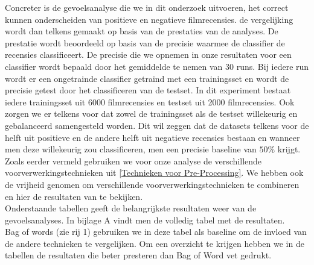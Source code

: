 Concreter is de gevoelsanalyse die we in dit onderzoek uitvoeren, het correct kunnen onderscheiden van positieve en negatieve filmrecensies. de vergelijking wordt dan telkens gemaakt op basis van de prestaties van de analyses. De prestatie wordt beoordeeld op basis van de precisie waarmee de classifier de recensies classificeert. De precisie die we opnemen in onze resultaten voor een classifier wordt bepaald door het gemiddelde te nemen van 30 runs. Bij iedere run wordt er een ongetrainde classifier getraind met een trainingsset en wordt de precisie getest door het classificeren van de testset. In dit experiment bestaat iedere trainingsset uit 6000 filmrecensies en testset uit 2000 filmrecensies. Ook zorgen we er telkens voor dat zowel de trainingsset als de testset willekeurig en gebalanceerd samengesteld worden. Dit wil zeggen dat de datasets telkens voor de helft uit positieve en de andere helft uit negatieve recensies bestaan en wanneer men deze willekeurig zou classificeren, men een precisie baseline van $50\%$ krijgt.\\

Zoals eerder vermeld gebruiken we voor onze analyse de verschillende voorverwerkingstechnieken uit \ref{Technieken voor Pre-Processing}. We hebben ook de vrijheid genomen om verschillende voorverwerkingstechnieken te combineren en hier de resultaten van te bekijken.\\
Onderstaande tabellen geeft de belangrijkste resultaten weer van de gevoelsanalyses. In bijlage A vindt men de volledig tabel met de resultaten. \\ 
Bag of words (zie rij 1) gebruiken we in deze tabel als baseline om de invloed van de andere technieken te vergelijken. Om een overzicht te krijgen hebben we in de tabellen de resultaten die beter presteren dan Bag of Word vet gedrukt. 

